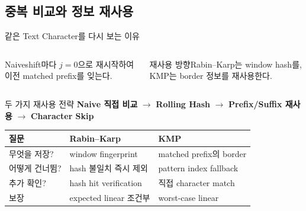 \subsection{중복 비교와 정보 재사용}
\begin{frame}{같은 Text Character를 다시 보는 이유}
\begin{columns}[T]
\begin{alertblock}{Naive}shift마다 \(j=0\)으로 재시작하여 이전 matched prefix를 잊는다.\end{alertblock}
\begin{block}{재사용 방향}Rabin--Karp는 window hash를, KMP는 border 정보를 재사용한다.\end{block}
\end{columns}
\end{frame}
\begin{frame}{두 가지 재사용 전략}
\centering
\footnotesize
\textbf{Naive 직접 비교}
\(\longrightarrow\)
\textbf{Rolling Hash}
\(\longrightarrow\)
\textbf{Prefix/Suffix 재사용}
\(\longrightarrow\)
\textbf{Character Skip}
\vspace{2mm}

\small\begin{tabular}{lll}\toprule
질문&Rabin--Karp&KMP\\\midrule
무엇을 저장?&window fingerprint&matched prefix의 border\\
어떻게 건너뜀?&hash 불일치 즉시 제외&pattern index fallback\\
추가 확인?&hash hit verification&직접 character match\\
보장&expected linear 조건부&worst-case linear\\\bottomrule
\end{tabular}
\end{frame}
